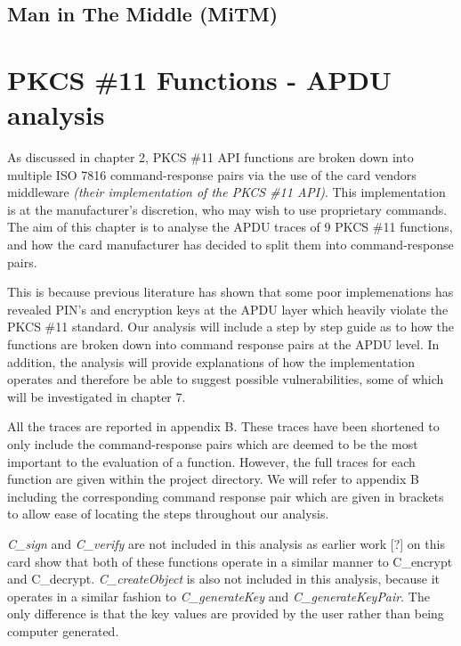 \documentclass[bsc,frontabs,twoside,singlespacing,parskip,deptreport]{infthesis}     %
\begin{document}
\section{Man in The Middle (MiTM)}




\chapter{PKCS \#11 Functions - APDU analysis}

As discussed in chapter 2, PKCS \#11 API functions are broken down into multiple ISO 7816 command-response pairs via the use of the card vendors middleware \textit{(their implementation of the PKCS \#11 API)}. This implementation is  at the manufacturer's discretion, who may wish to use proprietary commands. The aim of this chapter is to analyse the APDU traces of 9 PKCS \#11 functions, and how the card manufacturer has decided to split them into command-response pairs. 

This is because previous literature has shown that some poor implemenations has revealed PIN's and encryption keys at the APDU layer which heavily violate the PKCS \#11 standard. Our analysis will include a step by step guide as to how the functions are broken down into command response pairs at the APDU level.  In addition, the analysis will provide explanations of how the implementation operates and therefore be able to suggest possible vulnerabilities, some of which will be investigated in chapter 7. 

All the traces are reported in appendix B. These traces have been shortened to only include the command-response pairs which are deemed to be the most important to the evaluation of a function. However, the full traces for each function are given within the project directory. We will refer to appendix B including the corresponding command response pair which are given in brackets to allow ease of locating the steps throughout our analysis.

\textit{C\_sign} and \textit{C\_verify} are not included in this analysis as earlier work [?] on this card show that both of these functions operate in a similar manner to C\_encrypt and C\_decrypt. \textit{C\_createObject} is also not included in this analysis, because it operates in a similar fashion to \textit{C\_generateKey} and \textit{C\_generateKeyPair}. The only difference is that the key values are provided by the user rather than being computer generated.
\end{document}
